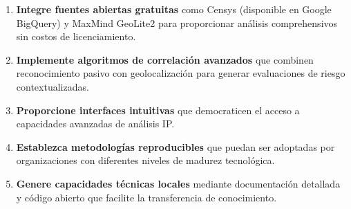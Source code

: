 \begin{enumerate}
    \item \textbf{Integre fuentes abiertas gratuitas} como Censys (disponible en Google BigQuery) y MaxMind GeoLite2 para proporcionar análisis comprehensivos sin costos de licenciamiento.
    \item \textbf{Implemente algoritmos de correlación avanzados} que combinen reconocimiento pasivo con geolocalización para generar evaluaciones de riesgo contextualizadas.
    \item \textbf{Proporcione interfaces intuitivas} que democraticen el acceso a capacidades avanzadas de análisis IP.
    \item \textbf{Establezca metodologías reproducibles} que puedan ser adoptadas por organizaciones con diferentes niveles de madurez tecnológica.
    \item \textbf{Genere capacidades técnicas locales} mediante documentación detallada y código abierto que facilite la transferencia de conocimiento.
\end{enumerate}